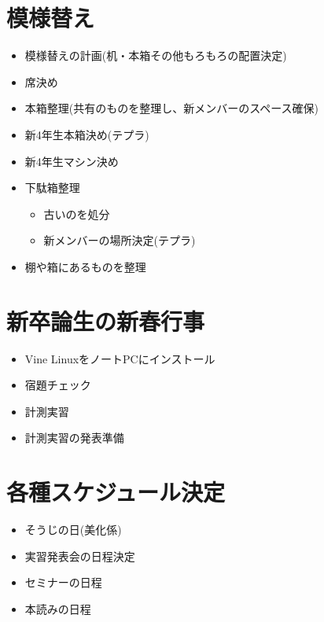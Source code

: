 \documentclass[twocolumn,11pt]{jsarticle}
\begin{document}
\section{模様替え}
\begin{itemize}
\item 模様替えの計画(机・本箱その他もろもろの配置決定)
\item 席決め
\item 本箱整理(共有のものを整理し、新メンバーのスペース確保)
\item 新4年生本箱決め(テプラ)
\item 新4年生マシン決め
\item 下駄箱整理
  \begin{itemize}
  \item 古いのを処分
  \item 新メンバーの場所決定(テプラ)
  \end{itemize}
\item 棚や箱にあるものを整理
\end{itemize}

\section{新卒論生の新春行事}
\begin{itemize}
\item Vine LinuxをノートPCにインストール
\item 宿題チェック
\item 計測実習
\item 計測実習の発表準備
\end{itemize}

\section{各種スケジュール決定}

\begin{itemize}
\item そうじの日(美化係)
\item 実習発表会の日程決定
\item セミナーの日程
\item 本読みの日程
\end{itemize}

\appendix

\end{document}
